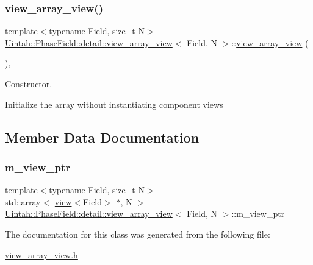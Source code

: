 \subsubsection{\texorpdfstring{view\+\_\+array\+\_\+view()}{view\_array\_view()}}
{\footnotesize\ttfamily template$<$typename Field, size\+\_\+t N$>$ \\
\hyperlink{classUintah_1_1PhaseField_1_1detail_1_1view__array__view}{Uintah\+::\+Phase\+Field\+::detail\+::view\+\_\+array\+\_\+view}$<$ Field, N $>$\+::\hyperlink{classUintah_1_1PhaseField_1_1detail_1_1view__array__view}{view\+\_\+array\+\_\+view} (\begin{DoxyParamCaption}{ }\end{DoxyParamCaption})\hspace{0.3cm}{\ttfamily [inline]}, {\ttfamily [protected]}}



Constructor. 

Initialize the array without instantiating component views 

\subsection{Member Data Documentation}
\mbox{\label{classUintah_1_1PhaseField_1_1detail_1_1view__array__view_a30d94983e4937efeb95483d926946d2e}} 
\subsubsection{\texorpdfstring{m\+\_\+view\+\_\+ptr}{m\_view\_ptr}}
{\footnotesize\ttfamily template$<$typename Field, size\+\_\+t N$>$ \\
std\+::array$<$ \hyperlink{classUintah_1_1PhaseField_1_1detail_1_1view}{view}$<$Field$>$ $\ast$, N $>$ \hyperlink{classUintah_1_1PhaseField_1_1detail_1_1view__array__view}{Uintah\+::\+Phase\+Field\+::detail\+::view\+\_\+array\+\_\+view}$<$ Field, N $>$\+::m\+\_\+view\+\_\+ptr\hspace{0.3cm}{\ttfamily [protected]}}



The documentation for this class was generated from the following file\+:\begin{DoxyCompactItemize}
\item 
\hyperlink{view__array__view_8h}{view\+\_\+array\+\_\+view.\+h}\end{DoxyCompactItemize}
